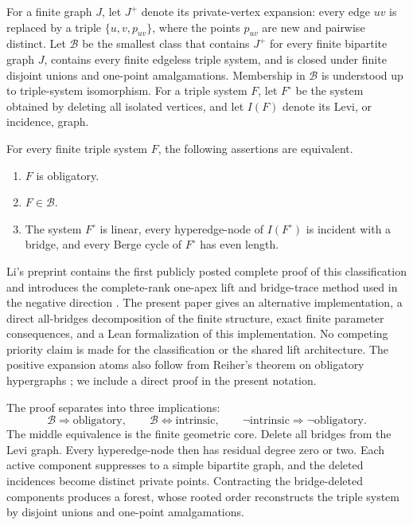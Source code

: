 For a finite graph $J$, let $J^+$ denote its private-vertex expansion: every
edge $uv$ is replaced by a triple $\{u,v,p_{uv}\}$, where the points $p_{uv}$
are new and pairwise distinct.  Let $\mathcal B$ be the smallest class that
contains $J^+$ for every finite bipartite graph $J$, contains every finite
edgeless triple system, and is closed under finite disjoint unions and
one-point amalgamations.  Membership in $\mathcal B$ is understood up to
triple-system isomorphism.  For a triple system $F$, let $F^\circ$ be the system
obtained by deleting all isolated vertices, and let $I(F)$ denote its Levi, or
incidence, graph.

\begin{theoremA}\label{theorem-a-ams}
For every finite triple system $F$, the following assertions are equivalent.
\begin{enumerate}
\item $F$ is obligatory.
\item $F\in\mathcal B$.
\item The system $F^\circ$ is linear, every hyperedge-node of $I(F^\circ)$ is
incident with a bridge, and every Berge cycle of $F^\circ$ has even length.
\end{enumerate}
\end{theoremA}

Li's preprint contains the first publicly posted complete proof of this
classification and introduces the complete-rank one-apex lift and bridge-trace
method used in the negative direction
\citep[Theorem~1.1 and Sections~3--4]{li2026}.  The present paper gives an
alternative implementation, a direct all-bridges decomposition of the finite
structure, exact finite parameter consequences, and a Lean formalization of
this implementation.  No competing priority claim is made for the
classification or the shared lift architecture.  The positive expansion atoms
also follow from Reiher's theorem on obligatory hypergraphs
\citep[Theorem~1.2]{reiher2024}; we include a direct proof in the present
notation.

The proof separates into three implications:
\[
\mathcal B\Longrightarrow\text{obligatory},\qquad
\mathcal B\Longleftrightarrow\text{intrinsic},\qquad
\neg\text{intrinsic}\Longrightarrow\neg\text{obligatory}.
\]
The middle equivalence is the finite geometric core.  Delete all bridges from
the Levi graph.  Every hyperedge-node then has residual degree zero or two.
Each active component suppresses to a simple bipartite graph, and the deleted
incidences become distinct private points.  Contracting the bridge-deleted
components produces a forest, whose rooted order reconstructs the triple system
by disjoint unions and one-point amalgamations.

